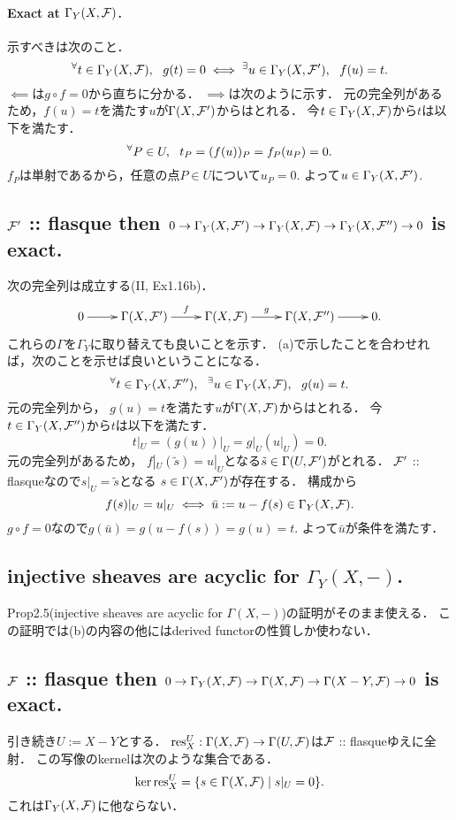 \documentclass[a4paper]{jsarticle}
\begin{document}
    \paragraph{Exact at $\Gamma_Y(X,\mathcal{F})$.}
    示すべきは次のこと．
    \[ {}^{\forall} t \in \Gamma_Y(X,\mathcal{F}),~~ g(t)=0 \iff {}^{\exists} u \in \Gamma_Y(X,\mathcal{F}'),~~ f(u)=t. \]
    $\impliedby$は$g \circ f=0$から直ちに分かる．
    $\implies$は次のように示す．
    元の完全列があるため，$f(u)=t$を満たす$u$が$\Gamma(X,\mathcal{F}')$からはとれる．
    今$t \in \Gamma_Y(X,\mathcal{F})$から$t$は以下を満たす．
    \[ {}^{\forall} P \in U,~~ t_P=(f(u))_P=f_P(u_P)=0. \]
    $f_P$は単射であるから，任意の点$P \in U$について$u_P=0$.
    よって$u \in \Gamma_Y(X,\mathcal{F}')$.

    \subsection{$\mathcal{F}'$ :: flasque then
        $0 \to \Gamma_Y(X, \mathcal{F}') \to \Gamma_Y(X, \mathcal{F}) \to \Gamma_Y(X, \mathcal{F}'') \to 0$ is exact.}
    次の完全列は成立する(II, Ex1.16b)．
    \[\xymatrix{ 0 \ar[r]& \Gamma(X,\shF') \ar[r]^-{f}& \Gamma(X,\shF) \ar[r]^-{g}& \Gamma(X,\shF'') \ar[r]& 0. }\]
    これらの$\Gamma$を$\Gamma_Y$に取り替えても良いことを示す．
    (a)で示したことを合わせれば，次のことを示せば良いということになる．
    \[ {}^{\forall} t \in \Gamma_Y(X,\mathcal{F}''),~~ {}^{\exists} u \in \Gamma_Y(X,\mathcal{F}),~~ g(u)=t. \]
    元の完全列から，
    $g(u)=t$を満たす$u$が$\Gamma(X,\mathcal{F})$からはとれる．
    今$t \in \Gamma_Y(X,\mathcal{F}'')$から$t$は以下を満たす．
    \[ t|_U=(g(u))|_U=g|_U(u|_U)=0. \]
    元の完全列があるため，
    $f|_{U}(\tilde{s})=u|_{U}$となる$\tilde{s} \in \Gamma(U,\mathcal{F}')$がとれる．
    $\mathcal{F}'$ :: flasqueなので$s|_U=\tilde{s}$となる
    $s \in \Gamma(X, \mathcal{F}')$が存在する．
    構成から
    \[ f(s)|_U=u|_U \iff \bar{u}:=u-f(s) \in \Gamma_Y(X,\mathcal{F}). \]
    $g \circ f=0$なので$g(\bar{u})=g(u-f(s))=g(u)=t$.
    よって$\bar{u}$が条件を満たす．

    \subsection{injective sheaves are acyclic for $\Gamma_Y(X, -)$.}
    Prop2.5(injective sheaves are acyclic for $\Gamma(X,-)$)の証明がそのまま使える．
    この証明では(b)の内容の他にはderived functorの性質しか使わない．

    \subsection{$\mathcal{F}$ :: flasque then
        $0 \to \Gamma_Y(X, \mathcal{F}) \to \Gamma(X, \mathcal{F}) \to \Gamma(X-Y, \mathcal{F}) \to 0$ is exact.}
    引き続き$U:=X-Y$とする．
    $\operatorname{res}_X^U: \Gamma(X, \mathcal{F}) \to \Gamma(U, \mathcal{F})$は$\mathcal{F}$ :: flasqueゆえに全射．
    この写像のkernelは次のような集合である．
    \[ \ker \operatorname{res}_X^U=\{ s \in \Gamma(X, \mathcal{F}) \mid s|_U=0 \}. \]
    これは$\Gamma_Y(X, \mathcal{F})$に他ならない．
\end{document}
